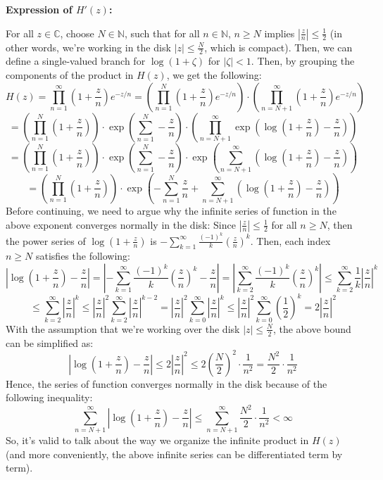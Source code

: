 \documentclass{article}
\begin{document}
\hfil

\textbf{Expression of $H'(z)$:}

For all $z\in\mathbb{C}$, choose $N\in\mathbb{N}$, such that for all $n\in\mathbb{N}$, $n\geq N$ implies $\left|\frac{z}{n}\right|\leq \frac{1}{2}$ (in other words, we're working in the disk $|z|\leq \frac{N}{2}$, which is compact). 
Then, we can define a single-valued branch for $\log(1+\zeta)$ for $|\zeta|<1$.
Then, by grouping the components of the product in $H(z)$, we get the following:
$$H(z)=\prod_{n=1}^{\infty}\left(1+\frac{z}{n}\right)e^{-z/n}=\left(\prod_{n=1}^{N}\left(1+\frac{z}{n}\right)e^{-z/n}\right)\cdot\left(\prod_{n=N+1}^{\infty}\left(1+\frac{z}{n}\right)e^{-z/n}\right)$$
$$=\left(\prod_{n=1}^{N}\left(1+\frac{z}{n}\right)\right)\cdot \exp\left(\sum_{n=1}^{N}-\frac{z}{n}\right)\cdot\left(\prod_{n=N+1}^{\infty}\exp\left(\log\left(1+\frac{z}{n}\right)-\frac{z}{n}\right)\right)$$
$$=\left(\prod_{n=1}^{N}\left(1+\frac{z}{n}\right)\right)\cdot \exp\left(\sum_{n=1}^{N}-\frac{z}{n}\right)\cdot\exp\left(\sum_{n=N+1}^{\infty}\left(\log\left(1+\frac{z}{n}\right)-\frac{z}{n}\right)\right)$$
$$=\left(\prod_{n=1}^{N}\left(1+\frac{z}{n}\right)\right)\cdot\exp\left(-\sum_{n=1}^{N}\frac{z}{n}+\sum_{n=N+1}^{\infty}\left(\log\left(1+\frac{z}{n}\right)-\frac{z}{n}\right)\right)$$
Before continuing, we need to argue why the infinite series of function in the above exponent converges normally in the disk:
Since $\left|\frac{z}{n}\right|\leq \frac{1}{2}$ for all $n\geq N$, then the power series of $\log(1+\frac{z}{n})$ is $-\sum_{k=1}^{\infty}\frac{(-1)^k}{k}\left(\frac{z}{n}\right)^k$. Then, each index $n\geq N$ satisfies the following:
$$\left|\log\left(1+\frac{z}{n}\right)-\frac{z}{n}\right|=\left|-\sum_{k=1}^{\infty}\frac{(-1)^k}{k}\left(\frac{z}{n}\right)^k-\frac{z}{n}\right| = \left|\sum_{k=2}^{\infty}\frac{(-1)^k}{k}\left(\frac{z}{n}\right)^k\right| \leq \sum_{k=2}^{\infty}\frac{1}{k}\left|\frac{z}{n}\right|^k$$
$$\leq \sum_{k=2}^{\infty}\left|\frac{z}{n}\right|^k\leq \left|\frac{z}{n}\right|^2\sum_{k=2}^{\infty}\left|\frac{z}{n}\right|^{k-2} = \left|\frac{z}{n}\right|^2\sum_{k=0}^{\infty}\left|\frac{z}{n}\right|^k\leq \left|\frac{z}{n}\right|^2\sum_{k=0}^{\infty}\left(\frac{1}{2}\right)^k = 2\left|\frac{z}{n}\right|^2$$
With the assumption that we're working over the disk $|z|\leq \frac{N}{2}$, the above bound can be simplified as:
$$\left|\log\left(1+\frac{z}{n}\right)-\frac{z}{n}\right|\leq 2\left|\frac{z}{n}\right|^2 \leq 2\left(\frac{N}{2}\right)^2\cdot\frac{1}{n^2} = \frac{N^2}{2}\cdot\frac{1}{n^2}$$
Hence, the series of function converges normally in the disk because of the following inequality:
$$\sum_{n=N+1}^{\infty}\left|\log\left(1+\frac{z}{n}\right)-\frac{z}{n}\right|\leq \sum_{n=N+1}^{\infty}\frac{N^2}{2}\cdot\frac{1}{n^2}<\infty$$
So, it's valid to talk about the way we organize the infinite product in $H(z)$ (and more conveniently, the above infinite series can be differentiated term by term).
\end{document}
